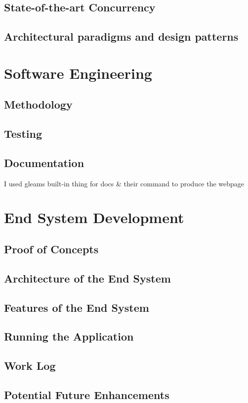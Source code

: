 \documentclass[]{project_interim}
\begin{document}
\section{State-of-the-art Concurrency}
\section{Architectural paradigms and design patterns}

\chapter{Software Engineering}
\section{Methodology}
\section{Testing}
\section{Documentation}
I used gleams built-in thing for docs \& their command to produce the webpage

\chapter{End System Development}
\section{Proof of Concepts}
\section{Architecture of the End System}
\section{Features of the End System}
\section{Running the Application}
\section{Work Log}
\section{Potential Future Enhancements}
\end{document}
